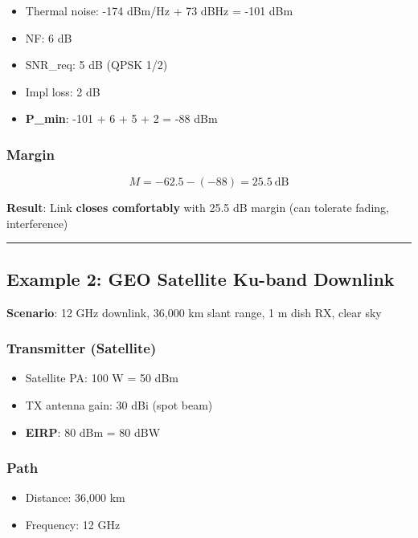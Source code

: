 \begin{itemize}
\tightlist
\item
  Thermal noise: -174 dBm/Hz + 73 dBHz = -101 dBm
\item
  NF: 6 dB
\item
  SNR\_req: 5 dB (QPSK 1/2)
\item
  Impl loss: 2 dB
\item
  \textbf{P\_min}: -101 + 6 + 5 + 2 = -88 dBm
\end{itemize}

\subsubsection{Margin}\label{margin}

\[
M = -62.5 - (-88) = 25.5\ \text{dB}
\]

\textbf{Result}: Link \textbf{closes comfortably} with 25.5 dB margin
(can tolerate fading, interference)

\begin{center}\rule{0.5\linewidth}{0.5pt}\end{center}

\subsection{Example 2: GEO Satellite Ku-band
Downlink}\label{example-2-geo-satellite-ku-band-downlink}

\textbf{Scenario}: 12 GHz downlink, 36,000 km slant range, 1 m dish RX,
clear sky

\subsubsection{Transmitter (Satellite)}\label{transmitter-satellite}

\begin{itemize}
\tightlist
\item
  Satellite PA: 100 W = 50 dBm
\item
  TX antenna gain: 30 dBi (spot beam)
\item
  \textbf{EIRP}: 80 dBm = 80 dBW
\end{itemize}

\subsubsection{Path}\label{path-1}

\begin{itemize}
\tightlist
\item
  Distance: 36,000 km
\item
  Frequency: 12 GHz
\end{itemize}


